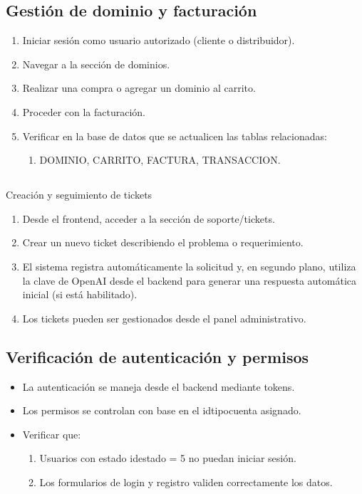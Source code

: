 \subsection{Gestión de dominio y facturación}
\begin{enumerate}
    \item Iniciar sesión como usuario autorizado (cliente o distribuidor). 
    \item Navegar a la sección de dominios. 
    \item Realizar una compra o agregar un dominio al carrito. 
    \item Proceder con la facturación. 
    \item Verificar en la base de datos que se actualicen las tablas relacionadas: 
    \begin{enumerate}
        \item DOMINIO, CARRITO, FACTURA, TRANSACCION.
    \end{enumerate} 
\end{enumerate}

\subsection{}{Creación y seguimiento de tickets}
\begin{enumerate}
    \item Desde el frontend, acceder a la sección de soporte/tickets. 
    \item Crear un nuevo ticket describiendo el problema o requerimiento. 
    \item El sistema registra automáticamente la solicitud y, en segundo plano, utiliza la clave de OpenAI desde el backend para generar una respuesta automática inicial (si está habilitado). 
    \item Los tickets pueden ser gestionados desde el panel administrativo. 
\end{enumerate}

\subsection{Verificación de autenticación y permisos}
\begin{itemize}
    \item La autenticación se maneja desde el backend mediante tokens. 
    \item Los permisos se controlan con base en el idtipocuenta asignado. 
    \item Verificar que: 
    \begin{enumerate}
        \item Usuarios con estado idestado = 5 no puedan iniciar sesión. 
        \item Los formularios de login y registro validen correctamente los datos.
    \end{enumerate} 
\end{itemize}






 
